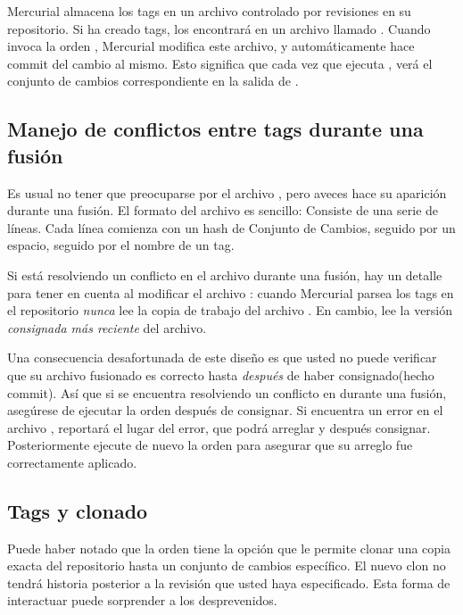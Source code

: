 Mercurial almacena los tags en un archivo controlado por revisiones en
su repositorio. Si ha creado tags, los encontrará en un archivo
llamado .  Cuando invoca la orden ,
Mercurial modifica este archivo, y automáticamente hace commit del
cambio al mismo.  Esto significa que cada vez que ejecuta ,
verá el conjunto de cambios correspondiente en la salida de .

\subsection{Manejo de conflictos entre tags durante una fusión}

Es usual no tener que preocuparse por el archivo ,
pero aveces hace su aparición durante una fusión. El formato del
archivo es sencillo: Consiste de una serie de líneas. Cada línea
comienza con un hash de Conjunto de Cambios, seguido por un espacio,
seguido por el nombre de un tag.

Si está resolviendo un conflicto en el archivo 
durante una fusión, hay un detalle para tener en cuenta al modificar
el archivo :
cuando Mercurial parsea los tags en el repositorio \emph{nunca}
lee la copia de trabajo del archivo .  En cambio,
lee la versión \emph{consignada más reciente} del archivo.

Una consecuencia desafortunada de este diseño es que usted no puede
verificar que su archivo  fusionado es correcto hasta
\emph{después} de haber consignado(hecho commit). Así que si se
encuentra resolviendo un conflicto en  durante una
fusión, asegúrese de ejecutar la orden  después de
consignar. Si encuentra un error en el archivo , 
reportará el lugar del error, que podrá arreglar y después
consignar. Posteriormente ejecute de nuevo la orden  para
asegurar que su arreglo fue correctamente aplicado.

\subsection{Tags y clonado}

Puede haber notado que la orden  tiene la opción
 que le permite clonar una copia exacta del
repositorio hasta un conjunto de cambios específico. El nuevo clon no
tendrá historia posterior a la revisión que usted haya
especificado. Esta forma de interactuar puede sorprender a los
desprevenidos.

